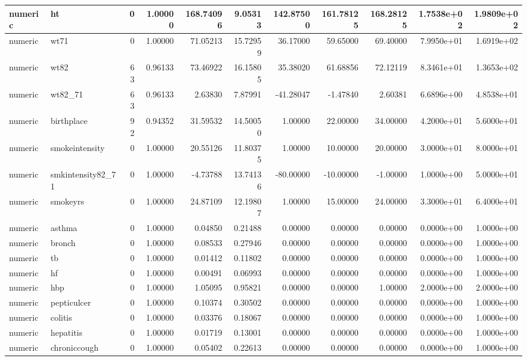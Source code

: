 \documentclass[12pt, krantz2,]{krantz}
\theoremstyle{definition}
\theoremstyle{definition}
\theoremstyle{definition}
\newcommand{\1}{\mathbbm{1}}
\begin{document}
\begin{tabular}{l|l|r|r|r|r|r|r|r|r|r}
\hline
numeric & ht & 0 & 1.00000 & 168.74096 & 9.05313 & 142.87500 & 161.78125 & 168.28125 & 1.7538e+02 & 1.9809e+02\\
\hline
numeric & wt71 & 0 & 1.00000 & 71.05213 & 15.72959 & 36.17000 & 59.65000 & 69.40000 & 7.9950e+01 & 1.6919e+02\\
\hline
numeric & wt82 & 63 & 0.96133 & 73.46922 & 16.15805 & 35.38020 & 61.68856 & 72.12119 & 8.3461e+01 & 1.3653e+02\\
\hline
numeric & wt82\_71 & 63 & 0.96133 & 2.63830 & 7.87991 & -41.28047 & -1.47840 & 2.60381 & 6.6896e+00 & 4.8538e+01\\
\hline
numeric & birthplace & 92 & 0.94352 & 31.59532 & 14.50050 & 1.00000 & 22.00000 & 34.00000 & 4.2000e+01 & 5.6000e+01\\
\hline
numeric & smokeintensity & 0 & 1.00000 & 20.55126 & 11.80375 & 1.00000 & 10.00000 & 20.00000 & 3.0000e+01 & 8.0000e+01\\
\hline
numeric & smkintensity82\_71 & 0 & 1.00000 & -4.73788 & 13.74136 & -80.00000 & -10.00000 & -1.00000 & 1.0000e+00 & 5.0000e+01\\
\hline
numeric & smokeyrs & 0 & 1.00000 & 24.87109 & 12.19807 & 1.00000 & 15.00000 & 24.00000 & 3.3000e+01 & 6.4000e+01\\
\hline
numeric & asthma & 0 & 1.00000 & 0.04850 & 0.21488 & 0.00000 & 0.00000 & 0.00000 & 0.0000e+00 & 1.0000e+00\\
\hline
numeric & bronch & 0 & 1.00000 & 0.08533 & 0.27946 & 0.00000 & 0.00000 & 0.00000 & 0.0000e+00 & 1.0000e+00\\
\hline
numeric & tb & 0 & 1.00000 & 0.01412 & 0.11802 & 0.00000 & 0.00000 & 0.00000 & 0.0000e+00 & 1.0000e+00\\
\hline
numeric & hf & 0 & 1.00000 & 0.00491 & 0.06993 & 0.00000 & 0.00000 & 0.00000 & 0.0000e+00 & 1.0000e+00\\
\hline
numeric & hbp & 0 & 1.00000 & 1.05095 & 0.95821 & 0.00000 & 0.00000 & 1.00000 & 2.0000e+00 & 2.0000e+00\\
\hline
numeric & pepticulcer & 0 & 1.00000 & 0.10374 & 0.30502 & 0.00000 & 0.00000 & 0.00000 & 0.0000e+00 & 1.0000e+00\\
\hline
numeric & colitis & 0 & 1.00000 & 0.03376 & 0.18067 & 0.00000 & 0.00000 & 0.00000 & 0.0000e+00 & 1.0000e+00\\
\hline
numeric & hepatitis & 0 & 1.00000 & 0.01719 & 0.13001 & 0.00000 & 0.00000 & 0.00000 & 0.0000e+00 & 1.0000e+00\\
\hline
numeric & chroniccough & 0 & 1.00000 & 0.05402 & 0.22613 & 0.00000 & 0.00000 & 0.00000 & 0.0000e+00 & 1.0000e+00\\

\end{tabular}
\end{document}
